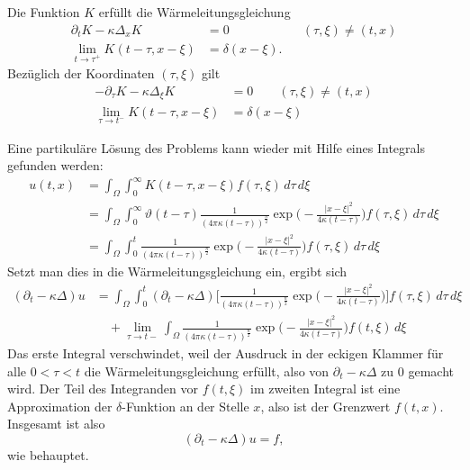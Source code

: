 \begin{satz}
Die Funktion $K$ erfüllt die Wärmeleitungsgleichung
\begin{align*}
\partial_tK-\kappa\Delta_xK&=0&&(\tau, \xi)\ne(t,x)
\\
\lim_{t\to\tau^+}K(t-\tau, x-\xi)&=\delta(x-\xi).
\end{align*}
Bezüglich der Koordinaten $(\tau,\xi)$ gilt
\begin{align*}
-\partial_{\tau} K-\kappa\Delta_{\xi}K&=0\qquad(\tau,\xi)\ne(t,x)
\\
\lim_{\tau\to t^-}K(t-\tau, x-\xi)&=\delta(x-\xi)
\end{align*}
\end{satz}

Eine partikuläre Lösung des Problems kann wieder mit Hilfe eines Integrals
gefunden werden:
\begin{align*}
u(t,x)
&=
\int_\Omega\int_0^\infty
K(t-\tau,x-\xi)f(\tau,\xi)
\,d\tau\,d\xi
\\
&=
\int_\Omega\int_0^\infty
\vartheta(t-\tau)\frac1{(4\pi\kappa(t-\tau))^{\frac{n}2}}
\exp\biggl(-\frac{|x-\xi|^2}{4\kappa(t-\tau)}\biggr)
f(\tau,\xi)
\,d\tau\,d\xi
\\
&=
\int_\Omega\int_0^t
\frac1{(4\pi\kappa(t-\tau))^{\frac{n}2}}
\exp\biggl(-\frac{|x-\xi|^2}{4\kappa(t-\tau)}\biggr)
f(\tau,\xi)
\,d\tau\,d\xi
\end{align*}
Setzt man dies in die Wärmeleitungsgleichung ein, ergibt sich
\begin{align*}
(\partial_t-\kappa\Delta)u
&=
\int_\Omega\int_0^t
(\partial_t-\kappa\Delta)\biggl[
\frac1{(4\pi\kappa(t-\tau))^{\frac{n}2}}
\exp\biggl(-\frac{|x-\xi|^2}{4\kappa(t-\tau)}\biggr)\biggr]
f(\tau,\xi)
\,d\tau\,d\xi
\\
&\quad+
\lim_{\tau\to t-}
\int_\Omega
\frac1{(4\pi\kappa(t-\tau))^{\frac{n}2}}
\exp\biggl(-\frac{|x-\xi|^2}{4\kappa(t-\tau)}\biggr)
f(t,\xi)
\,d\xi
\end{align*}
Das erste Integral verschwindet, weil der Ausdruck in der eckigen Klammer
für alle $0<\tau<t$ die Wärmeleitungsgleichung erfüllt, also von
$\partial_t-\kappa\Delta$ zu $0$ gemacht wird.
Der Teil des Integranden vor $f(t,\xi)$ im zweiten Integral ist eine
Approximation der $\delta$-Funktion an der Stelle $x$, also ist der Grenzwert
$f(t,x)$. Insgesamt ist also
\[
(\partial_t-\kappa\Delta)u=f,
\]
wie behauptet.

